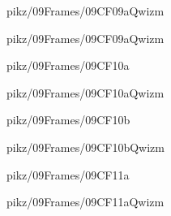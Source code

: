 \documentclass[9pt,xcolor={svgnames, x11names}]{beamer}
\begin{document}

\begin{frame}{pikz/09Frames/09CF09aQwizm}
	
\end{frame}

\begin{frame}{pikz/09Frames/09CF09aQwizm}
	
\end{frame}


\begin{frame}{pikz/09Frames/09CF10a}
	
\end{frame}


\begin{frame}{pikz/09Frames/09CF10aQwizm}
	
\end{frame}


\begin{frame}{pikz/09Frames/09CF10b}
	
\end{frame}

\begin{frame}{pikz/09Frames/09CF10bQwizm}
	
\end{frame}


\begin{frame}{pikz/09Frames/09CF11a}
	
\end{frame}

\begin{frame}{pikz/09Frames/09CF11aQwizm}
	
\end{frame}
\end{document}
